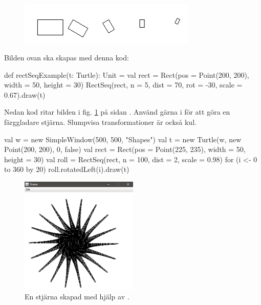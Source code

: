\begin{figure}[H]
\centering
\includegraphics[width=0.75\textwidth]{../img/turtle/RectSeq.png}
\end{figure}
\noindent Bilden ovan ska skapas med denna kod:
\begin{Code}
  def rectSeqExample(t: Turtle): Unit  = {
    val rect = Rect(pos = Point(200, 200), width = 50, height = 30)
    RectSeq(rect, n = 5, dist = 70, rot = -30, scale = 0.67).draw(t)
  }
\end{Code}

\noindent Nedan kod ritar bilden i fig. \ref{fig:classes:graphics:rectanglesequence} på sidan \pageref{fig:classes:graphics:rectanglesequence}. Använd gärna  i  för att göra en färggladare stjärna. Slumpvisa transformationer är också kul.

\begin{Code}
val w = new SimpleWindow(500, 500, "Shapes")
val t = new Turtle(w, new Point(200, 200), 0, false)
val rect = Rect(pos = Point(225, 235), width = 50, height = 30)
val roll = RectSeq(rect, n = 100, dist = 2, scale = 0.98)
for (i <- 0 to 360 by 20) roll.rotatedLeft(i).draw(t)
\end{Code}


\begin{figure}
\centering
\includegraphics[width=0.5\textwidth]{../img/w06-lab/RectangleSequence.png}
\caption {En stjärna skapad med hjälp av .}
\label{fig:classes:graphics:rectanglesequence}
\end{figure}

